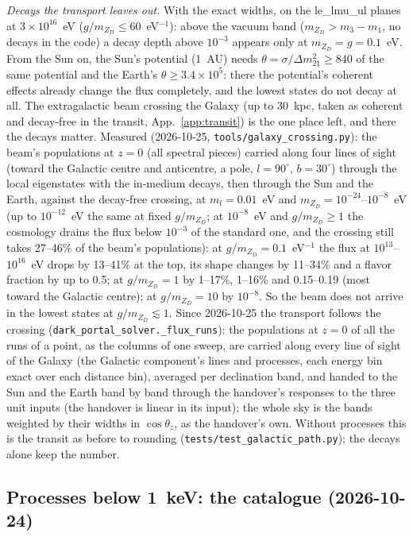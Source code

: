 \documentclass[11pt,a4paper]{article}
\newcommand{\file}[1]{\nolinkurl{#1}}
\newcommand{\mzd}{m_{Z_D}}
\begin{document}
\emph{Decays the transport leaves out.} With the exact widths, on the le\_lmu\_ul planes at $3\times10^{16}$~eV
($g/\mzd\le60$~eV$^{-1}$): above the vacuum band ($\mzd > m_3 - m_1$, no decays in the code) a decay depth above
$10^{-3}$ appears only at $\mzd = g = 0.1$~eV. From the Sun on, the Sun's potential (1~AU) needs
$\theta = \sigma/\Delta m^2_{21}\ge840$ of the same potential and the Earth's $\theta\ge3.4\times10^5$: there the
potential's coherent effects already change the flux completely, and the lowest states do not decay at all. The
extragalactic beam crossing the Galaxy (up to 30~kpc, taken as coherent and decay-free in the transit,
App.~\ref{app:transit}) is the one place left, and there the decays matter. Measured (2026-10-25,
\file{tools/galaxy_crossing.py}): the beam's populations at $z = 0$ (all spectral pieces) carried along four lines of
sight (toward the Galactic centre and anticentre, a pole, $l = 90^\circ$, $b = 30^\circ$) through the local eigenstates
with the in-medium decays, then through the Sun and the Earth, against the decay-free crossing, at $m_l = 0.01$~eV and
$\mzd = 10^{-24}$--$10^{-8}$~eV (up to $10^{-12}$~eV the same at fixed $g/\mzd$; at $10^{-8}$~eV and
$g/\mzd\ge1$ the cosmology drains the flux below $10^{-3}$ of the standard one, and the crossing still takes 27--46\%
of the beam's populations): at $g/\mzd = 0.1$~eV$^{-1}$ the flux at
$10^{13}$--$10^{16}$~eV drops by 13--41\% at the top, its shape changes by 11--34\% and a flavor fraction by up to 0.5;
at $g/\mzd = 1$ by 1--17\%, 1--16\% and 0.15--0.19 (most toward the Galactic centre); at $g/\mzd = 10$ by $10^{-8}$.
So the beam does not arrive in the lowest states at $g/\mzd\lesssim1$. Since 2026-10-25 the transport follows the
crossing (\texttt{dark\_portal\_solver.\_flux\_runs}): the populations at $z = 0$ of all the runs of a point, as the
columns of one sweep, are carried along every line of sight of the Galaxy (the Galactic component's lines and
processes, each energy bin exact over each distance bin), averaged per declination band, and handed to the Sun and the
Earth band by band through the handover's responses to the three unit inputs (the handover is linear in its input);
the whole sky is the bands weighted by their widths in $\cos\theta_z$, as the handover's own. Without processes this is
the transit as before to rounding (\file{tests/test\_galactic\_path.py}); the decays alone keep the number.

\subsection{Processes below 1~keV: the catalogue (2026-10-24)}
\label{sec:process-catalogue}
\end{document}
